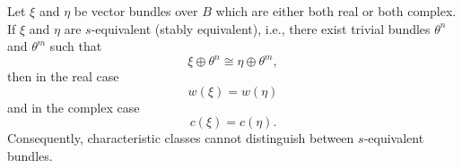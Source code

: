 Let $\xi$ and $\eta$ be vector bundles over $B$ which are either both real or both complex. If $\xi$ and $\eta$ are $s$-equivalent (stably equivalent), i.e., there exist trivial bundles $\theta^n$ and $\theta^m$ such that
$$\xi \oplus \theta^n \cong \eta \oplus \theta^m,$$
then in the real case
$$w(\xi) = w(\eta)$$
and in the complex case
$$c(\xi) = c(\eta).$$
Consequently, characteristic classes cannot distinguish between $s$-equivalent bundles.
